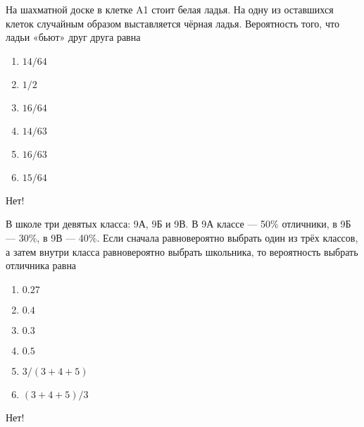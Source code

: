 \documentclass[t]{beamer}
\begin{document}
 \begin{frame} \label{3-No} 
\begin{block}{3} 

  На шахматной доске в клетке A1 стоит белая ладья. На одну из оставшихся клеток случайным образом выставляется чёрная ладья. Вероятность того, что ладьи «бьют» друг друга равна
  


 \end{block} 
\begin{enumerate} 
\item[] \hyperlink{3-No}{\beamergotobutton{} $14/64$}
\item[] \hyperlink{3-No}{\beamergotobutton{} $1/2$}
\item[] \hyperlink{3-No}{\beamergotobutton{} $16/64$}
\item[] \hyperlink{3-Yes}{\beamergotobutton{} $14/63$}
\item[] \hyperlink{3-No}{\beamergotobutton{} $16/63$}
\item[] \hyperlink{3-No}{\beamergotobutton{} $15/64$}
\end{enumerate} 

 \alert{Нет!} 
\end{frame} 


 \begin{frame} \label{4-No} 
\begin{block}{4} 

  В школе три девятых класса: 9А, 9Б и 9В. В 9А классе — 50\% отличники, в 9Б — 30\%, в 9В — 40\%. Если сначала равновероятно выбрать один из трёх классов, а затем внутри класса равновероятно выбрать школьника, то вероятность выбрать отличника равна
  


 \end{block} 
\begin{enumerate} 
\item[] \hyperlink{4-No}{\beamergotobutton{} $0.27$}
\item[] \hyperlink{4-Yes}{\beamergotobutton{} $0.4$}
\item[] \hyperlink{4-No}{\beamergotobutton{} $0.3$}
\item[] \hyperlink{4-No}{\beamergotobutton{} $0.5$}
\item[] \hyperlink{4-No}{\beamergotobutton{} $3/(3+4+5)$}
\item[] \hyperlink{4-No}{\beamergotobutton{} $(3+4+5)/3$}
\end{enumerate} 

 \alert{Нет!} 
\end{frame} 
\end{document}
